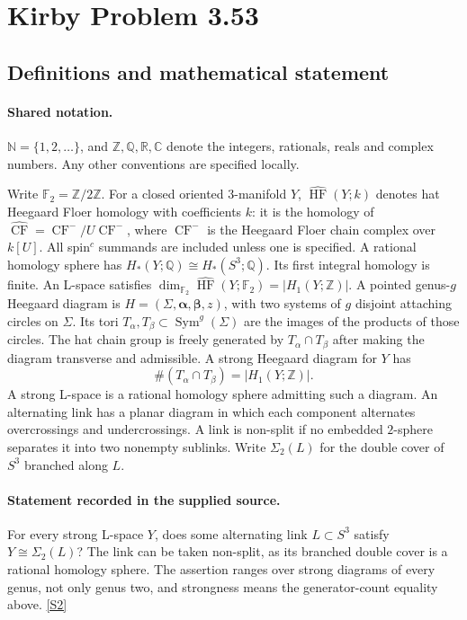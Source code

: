\documentclass[11pt]{article}
\newcommand{\sref}[2]{\hyperlink{source:#1:#2}{[S#2]}}
\begin{document}
\section{Kirby Problem 3.53}\label{statement}

\subsection{Definitions and mathematical statement}

\paragraph{Shared notation.}$\mathbb N=\{1,2,\ldots\}$, and $\mathbb Z,\mathbb Q,\mathbb R,\mathbb C$ denote the integers, rationals, reals and complex numbers. Any other conventions are specified locally.


Write $\mathbb F_2=\mathbb Z/2\mathbb Z$. For a closed oriented $3$-manifold $Y$, $\widehat{\operatorname{HF}}(Y;k)$ denotes hat Heegaard Floer homology with coefficients $k$: it is the homology of $\widehat{\operatorname{CF}}=\operatorname{CF}^-/U\operatorname{CF}^-$, where $\operatorname{CF}^-$ is the Heegaard Floer chain complex over $k[U]$. All spin$^c$ summands are included unless one is specified. A rational homology sphere has $H_*(Y;\mathbb Q)\cong H_*(S^3;\mathbb Q)$. Its first integral homology is finite. An L-space satisfies $\dim_{\mathbb F_2}\widehat{\operatorname{HF}}(Y;\mathbb F_2)=|H_1(Y;\mathbb Z)|$. A pointed genus-$g$ Heegaard diagram is $H=(\Sigma,\boldsymbol\alpha,\boldsymbol\beta,z)$, with two systems of $g$ disjoint attaching circles on $\Sigma$. Its tori $T_\alpha,T_\beta\subset\operatorname{Sym}^g(\Sigma)$ are the images of the products of those circles. The hat chain group is freely generated by $T_\alpha\cap T_\beta$ after making the diagram transverse and admissible. A strong Heegaard diagram for $Y$ has
\[
\#(T_\alpha\cap T_\beta)=|H_1(Y;\mathbb Z)|.
\]
A strong L-space is a rational homology sphere admitting such a diagram. An alternating link has a planar diagram in which each component alternates overcrossings and undercrossings. A link is non-split if no embedded $2$-sphere separates it into two nonempty sublinks. Write $\Sigma_2(L)$ for the double cover of $S^3$ branched along $L$.
\paragraph{Statement recorded in the supplied source.}
For every strong L-space $Y$, does some alternating link $L\subset S^3$ satisfy $Y\cong\Sigma_2(L)$? The link can be taken non-split, as its branched double cover is a rational homology sphere. The assertion ranges over strong diagrams of every genus, not only genus two, and strongness means the generator-count equality above. \sref{statement}{2}
\end{document}
